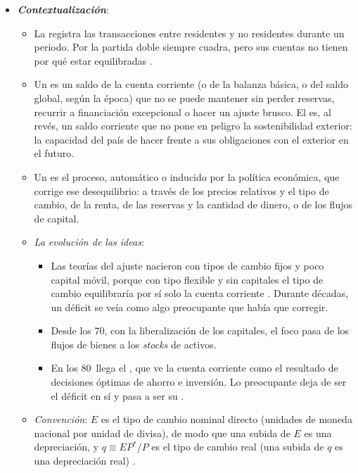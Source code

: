\documentclass[11pt]{article}
\begin{document}
\begin{itemize}
\item \textbf{\emph{Contextualización}}:
  \begin{itemize}
  \item La  registra las transacciones entre residentes y no residentes durante un periodo. Por la partida doble siempre cuadra, pero sus cuentas no tienen por qué estar equilibradas .
  \item Un  es un saldo de la cuenta corriente (o de la balanza básica, o del saldo global, según la época) que no se puede mantener sin perder reservas, recurrir a financiación excepcional o hacer un ajuste brusco. El  es, al revés, un saldo corriente que no pone en peligro la sostenibilidad exterior: la capacidad del país de hacer frente a sus obligaciones con el exterior en el futuro.
  \item Un  es el proceso, automático o inducido por la política económica, que corrige ese desequilibrio: a través de los precios relativos y el tipo de cambio, de la renta, de las reservas y la cantidad de dinero, o de los flujos de capital.
  \item \emph{La evolución de las ideas}:
    \begin{itemize}
    \item Las teorías del ajuste nacieron con tipos de cambio fijos y poco capital móvil, porque con tipo flexible y sin capitales el tipo de cambio equilibraría por sí solo la cuenta corriente . Durante décadas, un déficit se veía como algo preocupante que había que corregir.
    \item Desde los 70, con la liberalización de los capitales, el foco pasa de los flujos de bienes a los \emph{stocks} de activos.
    \item En los 80~llega el , que ve la cuenta corriente como el resultado de decisiones óptimas de ahorro e inversión. Lo preocupante deja de ser el déficit en sí y pasa a ser su .
    \end{itemize}
  \item \emph{Convención}: $E$ es el tipo de cambio nominal directo (unidades de moneda nacional por unidad de divisa), de modo que una subida de $E$ es una depreciación, y $q\equiv EP^*/P$ es el tipo de cambio real (una subida de $q$ es una depreciación real) .
  \end{itemize}


\end{itemize}
\end{document}
